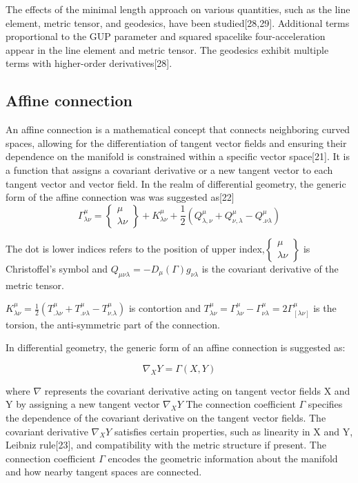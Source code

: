 \documentclass{article}
\begin{document}
The effects of the minimal length approach on various quantities, such as the line element, metric tensor, and geodesics, have been studied[28,29]. Additional terms proportional to the GUP parameter and squared spacelike four-acceleration appear in the line element and metric tensor. The geodesics exhibit multiple terms with higher-order derivatives[28].

\subsection{\Large Affine connection}
An affine connection is a mathematical concept that connects neighboring curved spaces, allowing for the differentiation of tangent vector fields and ensuring their dependence on the manifold is constrained within a specific vector space[21]. It is a function that assigns a covariant derivative or a new tangent vector to each tangent vector and vector field. In the realm of differential geometry, the generic form of the affine connection was was suggested as[22]
\begin{equation}
\Gamma^{\mu}_{\lambda\nu} = \begin{Bmatrix} \mu \\ \lambda \nu \end{Bmatrix} + K^{\mu}_{\lambda\nu} + \frac{1}{2} (Q^{\mu}_{\lambda,\nu} + Q^{\mu}_{\nu,\lambda} - Q^{\mu}_{.\nu\lambda})
\label{2}
\end{equation}

The dot is lower indices refers to the position of upper index,$\begin{Bmatrix} \mu \\ \lambda \nu \end{Bmatrix}$ is Christoffel's 
symbol and $Q_{\mu\nu\lambda} = -D_{\mu}(\Gamma)g_{\nu\lambda}$ is the covariant derivative of the metric tensor. 

\hspace{2cm}

$K^{\mu}_{\lambda\nu}=\frac{1}{2} (T^{\mu}_{.\lambda\nu} + T^{\mu}_{.\nu\lambda} - T^{\mu}_{\nu.\lambda})$ is contortion and ${T^\mu _{\lambda\nu}} = {\Gamma^\mu_{\lambda\nu}} - {\Gamma^\mu_{\nu\lambda}} = 2{\Gamma^\mu_{[\lambda\nu]}}
$ is the torsion, the anti-symmetric part of the connection.


In differential geometry, the generic form of an affine connection is suggested as:

$$\nabla_X Y=\Gamma(X,Y)$$

where 
$\nabla$ represents the covariant derivative acting on tangent vector fields X and  Y by assigning a new tangent vector  $\nabla_X Y$
 The connection coefficient $\Gamma$
 specifies the dependence of the covariant derivative on the tangent vector fields.
The covariant derivative 
$\nabla_X Y$ satisfies certain properties, such as linearity in 
X and 
Y, Leibniz rule[23], and compatibility with the metric structure if present. The connection coefficient 
$\Gamma$ encodes the geometric information about the manifold and how nearby tangent spaces are connected.
\end{document}
